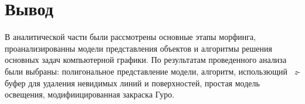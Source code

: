 \section*{Вывод}

В аналитической части были рассмотрены основные этапы морфинга, проанализированны модели представления объектов и алгоритмы решения основных задач компьютерной графики. По результатам проведенного анализа были выбраны: полигональное представление модели, алгоритм, использющий ~\textit{z}-буфер для удаления невидимых линий и поверхностей, простая модель освещения, модифиицированная закраска Гуро.


\clearpage